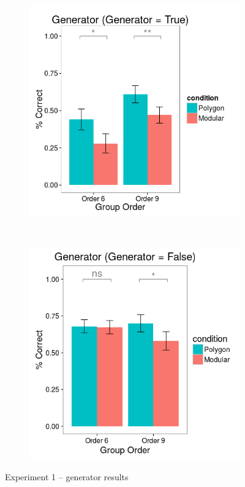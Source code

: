 \documentclass[man,mask,10pt]{apa6}
\begin{document}
\begin{figure}[H]
\centering
\begin{subfigure}[c]{0.3\textwidth}
\centering
\includegraphics[width=\textwidth]{figures/1/gen_T_r.png}
\end{subfigure}
~
\begin{subfigure}[c]{0.3\textwidth}
\centering
\includegraphics[width=\textwidth]{figures/1/gen_F_r.png}
\end{subfigure}
\caption{Experiment 1 -- generator results}
\label{ex1_gen}
\end{figure}\noindent 
\end{document}
